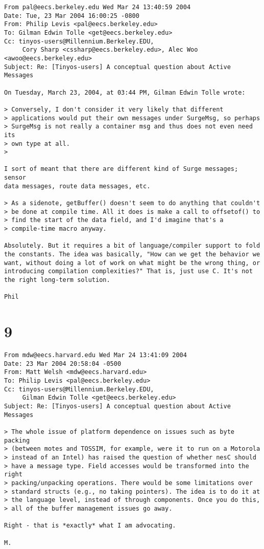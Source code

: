 \documentclass[10pt]{article}
\begin{document}
\begin{verbatim}
From pal@eecs.berkeley.edu Wed Mar 24 13:40:59 2004
Date: Tue, 23 Mar 2004 16:00:25 -0800
From: Philip Levis <pal@eecs.berkeley.edu>
To: Gilman Edwin Tolle <get@eecs.berkeley.edu>
Cc: tinyos-users@Millennium.Berkeley.EDU,
     Cory Sharp <cssharp@eecs.berkeley.edu>, Alec Woo <awoo@eecs.berkeley.edu>
Subject: Re: [Tinyos-users] A conceptual question about Active Messages

On Tuesday, March 23, 2004, at 03:44 PM, Gilman Edwin Tolle wrote:

> Conversely, I don't consider it very likely that different 
> applications would put their own messages under SurgeMsg, so perhaps 
> SurgeMsg is not really a container msg and thus does not even need its 
> own type at all.
>

I sort of meant that there are different kind of Surge messages; sensor 
data messages, route data messages, etc.

> As a sidenote, getBuffer() doesn't seem to do anything that couldn't 
> be done at compile time. All it does is make a call to offsetof() to 
> find the start of the data field, and I'd imagine that's a 
> compile-time macro anyway.

Absolutely. But it requires a bit of language/compiler support to fold 
the constants. The idea was basically, "How can we get the behavior we 
want, without doing a lot of work on what might be the wrong thing, or 
introducing compilation complexities?" That is, just use C. It's not 
the right long-term solution.

Phil

\end{verbatim}

\section*{9}

\begin{verbatim}
From mdw@eecs.harvard.edu Wed Mar 24 13:41:09 2004
Date: 23 Mar 2004 20:58:04 -0500
From: Matt Welsh <mdw@eecs.harvard.edu>
To: Philip Levis <pal@eecs.berkeley.edu>
Cc: tinyos-users@Millennium.Berkeley.EDU,
     Gilman Edwin Tolle <get@eecs.berkeley.edu>
Subject: Re: [Tinyos-users] A conceptual question about Active Messages

> The whole issue of platform dependence on issues such as byte packing 
> (between motes and TOSSIM, for example, were it to run on a Motorola 
> instead of an Intel) has raised the question of whether nesC should 
> have a message type. Field accesses would be transformed into the right 
> packing/unpacking operations. There would be some limitations over 
> standard structs (e.g., no taking pointers). The idea is to do it at 
> the language level, instead of through components. Once you do this, 
> all of the buffer management issues go away.

Right - that is *exactly* what I am advocating.

M.

\end{verbatim}
\end{document}
